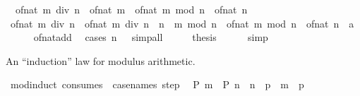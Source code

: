 \begin{isabellebody}
\ \ {\isachardoublequoteopen}of{\isacharunderscore}{\kern0pt}nat\ {\isacharparenleft}{\kern0pt}m\ div\ n{\isacharparenright}{\kern0pt}\ {\isacharequal}{\kern0pt}\ {\isacharparenleft}{\kern0pt}{\isacharparenleft}{\kern0pt}of{\isacharunderscore}{\kern0pt}nat\ m\ {\isacharminus}{\kern0pt}\ of{\isacharunderscore}{\kern0pt}nat\ {\isacharparenleft}{\kern0pt}m\ mod\ n{\isacharparenright}{\kern0pt}{\isacharparenright}{\kern0pt}\ {\isacharslash}{\kern0pt}\ of{\isacharunderscore}{\kern0pt}nat\ n{\isacharparenright}{\kern0pt}{\isachardoublequoteclose}\isanewline
%
\isadelimproof
%
\endisadelimproof
%
\isatagproof
{}\isamarkupfalse%
\ {\isacharminus}{\kern0pt}\isanewline
\ \ \isamarkupfalse%
\ {\isachardoublequoteopen}of{\isacharunderscore}{\kern0pt}nat\ {\isacharparenleft}{\kern0pt}m\ div\ n{\isacharparenright}{\kern0pt}\ {\isacharequal}{\kern0pt}\ {\isacharparenleft}{\kern0pt}{\isacharparenleft}{\kern0pt}of{\isacharunderscore}{\kern0pt}nat\ {\isacharparenleft}{\kern0pt}m\ div\ n\ {\isacharasterisk}{\kern0pt}\ n\ {\isacharplus}{\kern0pt}\ m\ mod\ n{\isacharparenright}{\kern0pt}\ {\isacharminus}{\kern0pt}\ of{\isacharunderscore}{\kern0pt}nat\ {\isacharparenleft}{\kern0pt}m\ mod\ n{\isacharparenright}{\kern0pt}{\isacharparenright}{\kern0pt}\ {\isacharslash}{\kern0pt}\ of{\isacharunderscore}{\kern0pt}nat\ n\ {\isacharcolon}{\kern0pt}{\isacharcolon}{\kern0pt}\ {\isacharprime}{\kern0pt}a{\isacharparenright}{\kern0pt}{\isachardoublequoteclose}\isanewline
\ \ \ \ \isamarkupfalse%
\ of{\isacharunderscore}{\kern0pt}nat{\isacharunderscore}{\kern0pt}add\ \isamarkupfalse%
\ {\isacharparenleft}{\kern0pt}cases\ {\isachardoublequoteopen}n\ {\isacharequal}{\kern0pt}\ {}{\isachardoublequoteclose}{\isacharparenright}{\kern0pt}\ simp{\isacharunderscore}{\kern0pt}all\isanewline
\ \ \isamarkupfalse%
\ \isamarkupfalse%
\ {\isacharquery}{\kern0pt}thesis\isanewline
\ \ \ \ \isamarkupfalse%
\ simp\isanewline
{}\isamarkupfalse%
%
\endisatagproof
{\isafoldproof}%
%
\isadelimproof
%
\endisadelimproof
%
\begin{isamarkuptext}%
An ``induction'' law for modulus arithmetic.%
\end{isamarkuptext}\isamarkuptrue%
\isamarkupfalse%
\ mod{\isacharunderscore}{\kern0pt}induct\ {\isacharbrackleft}{\kern0pt}consumes\ {}{\isacharcomma}{\kern0pt}\ case{\isacharunderscore}{\kern0pt}names\ step{\isacharbrackright}{\kern0pt}{\isacharcolon}{\kern0pt}\isanewline
\ \ {\isachardoublequoteopen}P\ m{\isachardoublequoteclose}\ \ {\isachardoublequoteopen}P\ n{\isachardoublequoteclose}\ \ {\isachardoublequoteopen}n\ {\isacharless}{\kern0pt}\ p{\isachardoublequoteclose}\ \ {\isachardoublequoteopen}m\ {\isacharless}{\kern0pt}\ p{\isachardoublequoteclose}\isanewline

\end{isabellebody}
